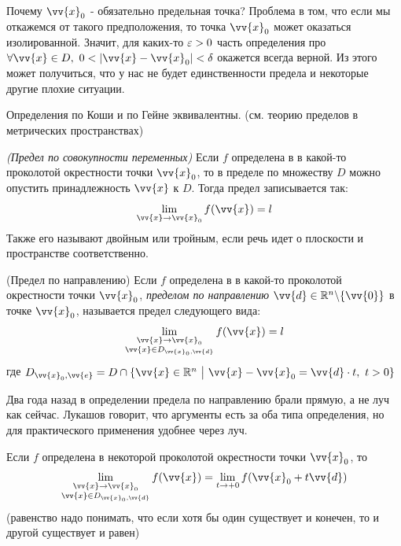 \begin{note}
	Почему $\vv{x}_0$ - обязательно предельная точка? Проблема в том, что если мы откажемся от такого предположения, то точка $\vv{x}_0$ может оказаться изолированной. Значит, для каких-то $\varepsilon > 0$ часть определения про $\forall \vv{x} \in D,\ 0 < |\vv{x} - \vv{x}_0| < \delta$ окажется всегда верной. Из этого может получиться, что у нас не будет единственности предела и некоторые другие плохие ситуации.
\end{note}

\begin{proposition}
	Определения по Коши и по Гейне эквивалентны. (см. теорию пределов в метрических пространствах)
\end{proposition}

\begin{definition}
	\textit{(Предел по совокупности переменных)}
	Если $f$ определена в в какой-то проколотой окрестности точки $\vv{x}_0$, то в пределе по множеству $D$ можно опустить принадлежность $\vv{x}$ к $D$. Тогда предел записывается так:
	\[
		\liml_{\vv{x} \to \vv{x}_0} f(\vv{x}) = l
	\]
	Также его называют двойным или тройным, если речь идет о плоскости и пространстве соответственно.
\end{definition}
\begin{definition} (Предел по направлению)
	Если $f$ определена в в какой-то проколотой окрестности точки $\vv{x}_0$, \textit{пределом по направлению} $\vv{d} \in \R^n \bs \{\vv{0}\}$ в точке $\vv{x}_0$, называется предел следующего вида:
	\[
		\liml_{\substack{\vv{x} \to \vv{x}_0 \\ \vv{x} \in D_{\vv{x}_0, \vv{d}}}} f(\vv{x}) = l
	\]
	где	\(
	D_{\vv{x}_0, \vv{e}} = D \cap \{\vv{x} \in \R^n \such \vv{x} - \vv{x}_0 = \vv{d} \cdot t,\ t > 0\}
	\)
\end{definition}

\begin{anote}
	Два года назад в определении предела по направлению брали прямую, а не луч как сейчас. Лукашов говорит, что аргументы есть за оба типа определения, но для практического применения удобнее через луч.
\end{anote}

\begin{lemma}
	Если $f$ определена в некоторой проколотой окрестности точки $\vv{x}_0$, то
	\[
		\liml_{\substack{\vv{x} \to \vv{x}_0 \\ \vv{x} \in D_{\vv{x}_0, \vv{d}}}} f(\vv{x}) = \liml_{t \to +0} f(\vv{x}_0 + t \vv{d})
	\]
	(равенство надо понимать, что если хотя бы один существует и конечен, то и другой существует и равен)
\end{lemma}

